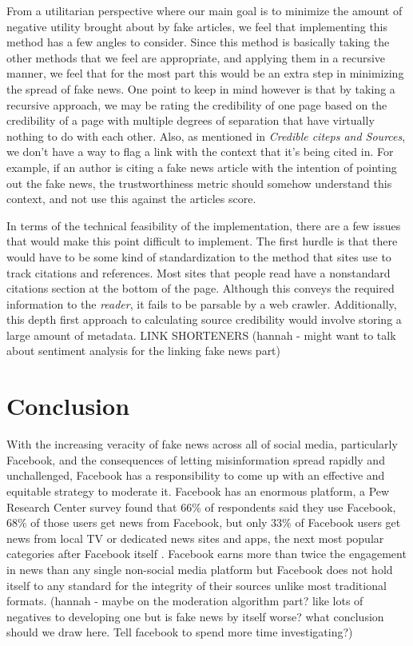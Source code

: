 \documentclass[12pt]{article}
\begin{document}
From a utilitarian perspective where our main goal is to minimize the amount of negative utility brought about by fake articles, we feel that implementing this method has a few angles to consider. Since this method is basically taking the other methods that we feel are appropriate, and applying them in a recursive manner, we feel that for the most part this would be an extra step in minimizing the spread of fake news. One point to keep in mind however is that by taking a recursive approach, we may be rating the credibility of one page based on the credibility of a page with multiple degrees of separation that have virtually nothing to do with each other. Also, as mentioned in \textit{Credible citeps and Sources}, we don't have a way to flag a link with the context that it's being cited in. For example, if an author is citing a fake news article with the intention of pointing out the fake news, the trustworthiness metric should somehow understand this context, and not use this against the articles score.

In terms of the technical feasibility of the implementation, there are a few issues that would make this point difficult to implement. The first hurdle is that there would have to be some kind of standardization to the method that sites use to track citations and references. Most sites that people read have a nonstandard citations section at the bottom of the page. Although this conveys the required information to the \textit{reader}, it fails to be parsable by a web crawler. Additionally, this depth first approach to calculating source credibility would involve storing a large amount of metadata. LINK SHORTENERS (hannah - might want to talk about sentiment analysis for the linking fake news part)

\section{Conclusion}

With the increasing veracity of fake news across all of social media, particularly Facebook, and the consequences of letting misinformation spread rapidly and unchallenged, Facebook has a responsibility to come up with an effective and equitable strategy to moderate it. Facebook has an enormous platform, a Pew Research Center survey found that 66\% of respondents said they use Facebook, 68\% of those users get news from Facebook, but only 33\% of Facebook users get news from local TV or dedicated news sites and apps, the next most popular categories after Facebook itself \citep{pew_news}. Facebook earns more than twice the engagement in news than any single non-social media platform but Facebook does not hold itself to any standard for the integrity of their sources unlike most traditional formats. (hannah - maybe on the moderation algorithm part? like lots of negatives to developing one but is fake news by itself worse? what conclusion should we draw here. Tell facebook to spend more time investigating?)
\end{document}
